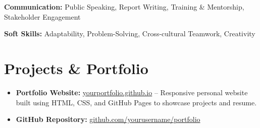\documentclass[a4paper,10pt]{article}
\begin{document}
\textbf{Communication:}
Public Speaking, Report Writing, Training \& Mentorship, Stakeholder Engagement

\textbf{Soft Skills:}
Adaptability, Problem-Solving, Cross-cultural Teamwork, Creativity

\section*{Projects \& Portfolio}
\begin{itemize}[leftmargin=*]
    \item \textbf{Portfolio Website:} \href{https://yourportfolio.github.io}{yourportfolio.github.io} – Responsive personal website built using HTML, CSS, and GitHub Pages to showcase projects and resume.
    \item \textbf{GitHub Repository:} \href{https://github.com/yourusername/portfolio}{github.com/yourusername/portfolio}
\end{itemize}
\end{document}
